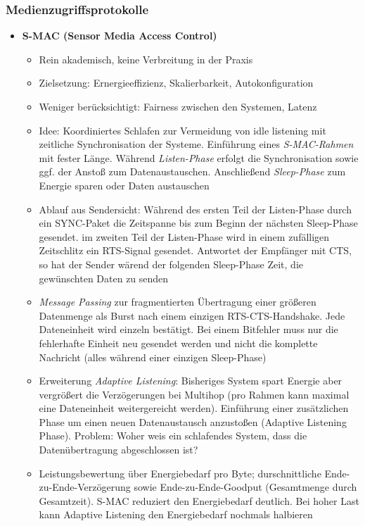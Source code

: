 \subsubsection{Medienzugriffsprotokolle}
\begin{itemize}
	\item \textbf{S-MAC (Sensor Media Access Control)}
	\begin{itemize}
		\item Rein akademisch, keine Verbreitung in der Praxis
		\item Zielsetzung: Ernergieeffizienz, Skalierbarkeit, Autokonfiguration
		\item Weniger berücksichtigt: Fairness zwischen den Systemen, Latenz
		\item Idee: Koordiniertes Schlafen zur Vermeidung von idle listening mit zeitliche Synchronisation der Systeme. Einführung eines \textit{S-MAC-Rahmen} mit fester Länge. Während \textit{Listen-Phase} erfolgt die Synchronisation sowie ggf. der Anstoß zum Datenaustauschen. Anschließend \textit{Sleep-Phase} zum Energie sparen oder Daten austauschen
		\item Ablauf aus Sendersicht: Während des ersten Teil der Listen-Phase durch ein SYNC-Paket die Zeitspanne bis zum Beginn der nächsten Sleep-Phase gesendet. im zweiten Teil der Listen-Phase wird in einem zufälligen Zeitschlitz ein RTS-Signal gesendet. Antwortet der Empfänger mit CTS, so hat der Sender wärend der folgenden Sleep-Phase Zeit, die gewünschten Daten zu senden
		\item \textit{Message Passing} zur fragmentierten Übertragung einer größeren Datenmenge als Burst nach einem einzigen RTS-CTS-Handshake. Jede Dateneinheit wird einzeln bestätigt. Bei einem Bitfehler muss nur die fehlerhafte Einheit neu gesendet werden und nicht die komplette Nachricht (alles während einer einzigen Sleep-Phase)
		\item Erweiterung \textit{Adaptive Listening}: Bisheriges System spart Energie aber vergrößert die Verzögerungen bei Multihop (pro Rahmen kann maximal eine Dateneinheit weitergereicht werden). Einführung einer zusätzlichen Phase um einen neuen Datenaustausch anzustoßen (Adaptive Listening Phase). Problem: Woher weis ein schlafendes System, dass die Datenübertragung abgeschlossen ist?
		\item Leistungsbewertung über Energiebedarf pro Byte; durschnittliche Ende-zu-Ende-Verzögerung sowie Ende-zu-Ende-Goodput (Gesamtmenge durch Gesamtzeit). S-MAC reduziert den Energiebedarf deutlich. Bei hoher Last kann Adaptive Listening den Energiebedarf nochmals halbieren

\end{itemize}
\end{itemize}

